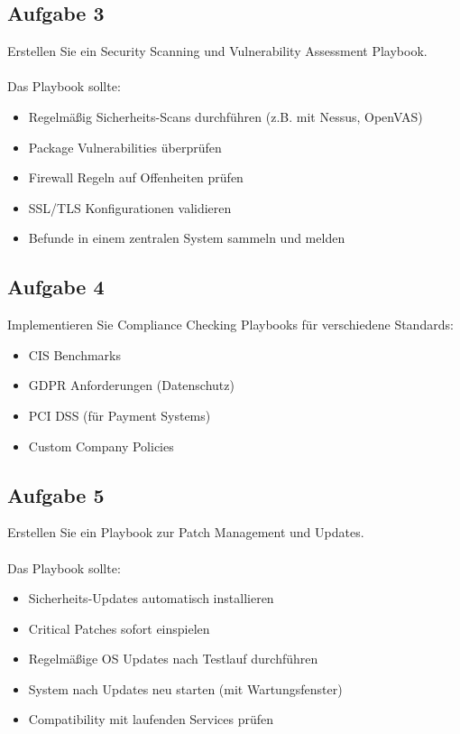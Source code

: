 \documentclass{article}
\begin{document}
    \subsection{Aufgabe 3}
    Erstellen Sie ein Security Scanning und Vulnerability Assessment Playbook.
    \\ \\
    Das Playbook sollte:
    \begin{itemize}
        \item Regelmäßig Sicherheits-Scans durchführen (z.B. mit Nessus, OpenVAS)
        \item Package Vulnerabilities überprüfen
        \item Firewall Regeln auf Offenheiten prüfen
        \item SSL/TLS Konfigurationen validieren
        \item Befunde in einem zentralen System sammeln und melden
    \end{itemize}

    \subsection{Aufgabe 4}
    Implementieren Sie Compliance Checking Playbooks für verschiedene Standards:
    \begin{itemize}
        \item CIS Benchmarks
        \item GDPR Anforderungen (Datenschutz)
        \item PCI DSS (für Payment Systems)
        \item Custom Company Policies
    \end{itemize}

    \subsection{Aufgabe 5}
    Erstellen Sie ein Playbook zur Patch Management und Updates.
    \\ \\
    Das Playbook sollte:
    \begin{itemize}
        \item Sicherheits-Updates automatisch installieren
        \item Critical Patches sofort einspielen
        \item Regelmäßige OS Updates nach Testlauf durchführen
        \item System nach Updates neu starten (mit Wartungsfenster)
        \item Compatibility mit laufenden Services prüfen
    \end{itemize}
\end{document}
